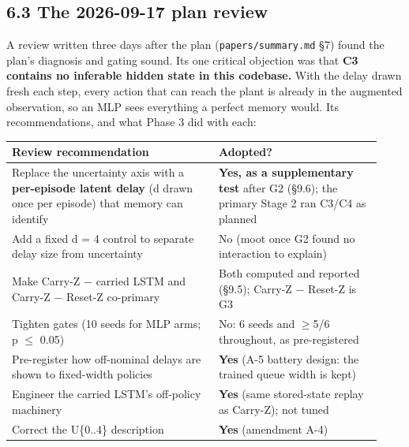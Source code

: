 \documentclass[11pt]{article}
\begin{document}
\subsection*{6.3 The 2026-09-17 plan review}



A review written three days after the plan (\texttt{papers/\allowbreak{}summary.\allowbreak{}md} \S{}7) found the plan's diagnosis and gating sound. Its one critical objection was that \textbf{C3 contains no inferable hidden state in this codebase.} With the delay drawn fresh each step, every action that can reach the plant is already in the augmented observation, so an MLP sees everything a perfect memory would. Its recommendations, and what Phase 3 did with each:



\begin{center}\small\begin{tabular}{>{\raggedright\arraybackslash}p{0.522\linewidth}>{\raggedright\arraybackslash}p{0.412\linewidth}}
\toprule
Review recommendation & Adopted? \\
\midrule
Replace the uncertainty axis with a \textbf{per-episode latent delay} (d drawn once per episode) that memory can identify & \textbf{Yes, as a supplementary test} after G2 (\S{}9.6); the primary Stage 2 ran C3/C4 as planned \\
Add a fixed d = 4 control to separate delay size from uncertainty & No (moot once G2 found no interaction to explain) \\
Make Carry-Z $-$ carried LSTM and Carry-Z $-$ Reset-Z co-primary & Both computed and reported (\S{}9.5); Carry-Z $-$ Reset-Z is G3 \\
Tighten gates (10 seeds for MLP arms; p $\leq$ 0.05) & No: 6 seeds and $\geq$5/6 throughout, as pre-registered \\
Pre-register how off-nominal delays are shown to fixed-width policies & \textbf{Yes} (A-5 battery design: the trained queue width is kept) \\
Engineer the carried LSTM's off-policy machinery & \textbf{Yes} (same stored-state replay as Carry-Z); not tuned \\
Correct the U\{0..4\} description & \textbf{Yes} (amendment A-4) \\
\bottomrule
\end{tabular}\end{center}
\end{document}
